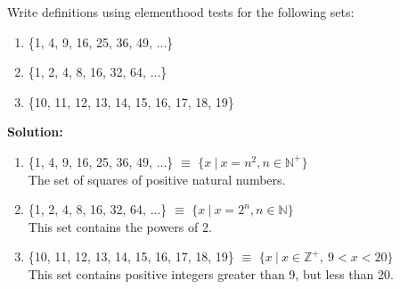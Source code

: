Write definitions using elementhood tests for the following sets:
\begin{enumerate}[label=(\alph*)]
    \item \{1, 4, 9, 16, 25, 36, 49, ...\}
    \item \{1, 2, 4, 8, 16, 32, 64, ...\}
    \item \{10, 11, 12, 13, 14, 15, 16, 17, 18, 19\}
\end{enumerate}

\textbf{Solution:}
\begin{enumerate}[label=(\alph*)]
    \item \{1, 4, 9, 16, 25, 36, 49, ...\} $\equiv$ $\{x \ | \ x = n^2, n \in \mathbb{N}^+\}$ \\
    The set of squares of positive natural numbers.
    
    \item \{1, 2, 4, 8, 16, 32, 64, ...\} $\equiv$ $\{x \ | \ x = 2^n, n \in \mathbb{N}\}$ \\
    This set contains the powers of 2.
    
    \item \{10, 11, 12, 13, 14, 15, 16, 17, 18, 19\} $\equiv$ $\{x \ | \ x \in \mathbb{Z}^+, \ 9 < x < 20\}$ \\
    This set contains positive integers greater than 9, but less than 20.
\end{enumerate}

\pagebreak